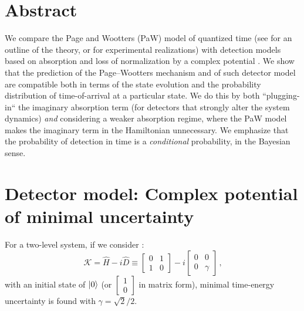 \documentclass[a0,landscape]{a0poster}
\DeclareMathOperator*{\repr}{\equiv}      %
\begin{document}
\begin{multicols}{3} 


\color{Navy} %

\section*{\large Abstract}
We compare the Page and Wootters (PaW) model of quantized time
(see \cite{PageWootters, Lloyd:Time} for an outline of the theory,
or \cite{Moreva:illustration, Moreva_position} for experimental realizations)
with detection models based on absorption and loss of normalization
by a complex potential \cite{RuschhauptAbsorption}. We show that the prediction
of the Page--Wootters mechanism and of such detector model are compatible both in terms
of the state evolution and
the probability distribution of
time-of-arrival at a particular state.
We do this by both ``plugging-in``
the imaginary absorption term (for detectors that strongly alter the system dynamics)
\emph{and} considering a weaker absorption regime, where the PaW model makes
the imaginary term in the Hamiltonian unnecessary. We emphasize that the probability
of detection in time is a \emph{conditional}
probability, in the Bayesian \cite{Maccone:QMOT} sense.



\setlength{\parindent}{1.5em} %


\large

\color{DarkSlateGray} %

\section*{Detector model: Complex potential of minimal uncertainty}

For a two-level system, if we consider \cite{RuschhauptAbsorption}:
\begin{equation}\label{eq:complexpot}
  \mathcal{K} = \hat{H} - i\hat{D} \repr
    \left[\begin{matrix}0 & 1\\1 & 0\end{matrix}\right] -
    i \left[\begin{matrix}0 & 0\\0 & \gamma \end{matrix}\right]
    \,\text{,}
\end{equation}
with an initial state of $\ket{0}$
(or $\left[\begin{matrix}1\\0\end{matrix}\right]$ in matrix form),
minimal time-energy uncertainty is found with $\gamma = \sqrt{2}/2$.


\end{multicols}
\end{document}
